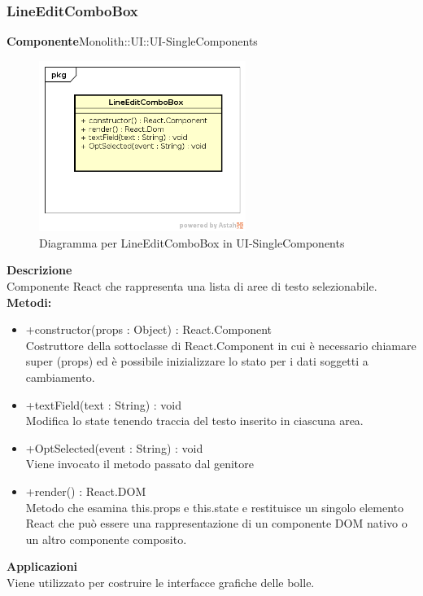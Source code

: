 \subsubsection{LineEditComboBox}
\textbf{Componente}Monolith::UI::UI-SingleComponents\\
   \FloatBarrier
   \begin{figure}[ht]
   \centering
   \includegraphics[width=0.6\textwidth]{img/single-LineEditComboBox}
   \caption{{Diagramma per LineEditComboBox in UI-SingleComponents}}
\end{figure}
\FloatBarrier
\textbf{Descrizione}\\
Componente React che rappresenta una lista di aree di testo selezionabile.
\textbf{Metodi:} \begin{itemize}\item +constructor(props : Object) : React.Component \\Costruttore della sottoclasse di React.Component in cui è necessario chiamare super (props) ed è possibile inizializzare lo stato per i dati soggetti a cambiamento.\item +textField(text : String) : void \\Modifica lo state tenendo traccia del testo inserito in ciascuna area.\item +OptSelected(event : String) : void  \\Viene invocato il metodo passato dal genitore\item +render() : React.DOM \\Metodo che esamina this.props e this.state e restituisce un singolo elemento React che può essere una rappresentazione di un componente DOM nativo o un altro componente composito.\end{itemize} 


\textbf{Applicazioni}\\
Viene utilizzato per costruire le interfacce grafiche delle bolle. 


